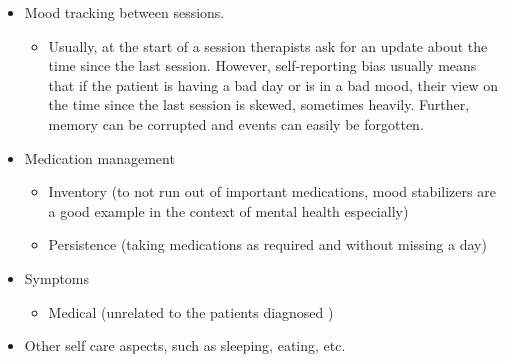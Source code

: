 \documentclass[11pt]{article}
\begin{document}
    \begin{itemize}
        \item Mood tracking between sessions.
        \begin{itemize}
            \item Usually, at the start of a session therapists ask for an update about the time since the last session.
            However, self-reporting bias usually means that if the patient is having a bad day or is in a bad mood, their view on the time since the last session is skewed, sometimes heavily.
            Further, memory can be corrupted and events can easily be forgotten.
        \end{itemize}
        \item Medication management
        \begin{itemize}
            \item Inventory (to not run out of important medications, mood stabilizers are a good example in the context of mental health especially)
            \item Persistence (taking medications as required and without missing a day)
        \end{itemize}
        \item Symptoms
        \begin{itemize}
            \item Medical (unrelated to the patients diagnosed )
        \end{itemize}
        \item Other self care aspects, such as sleeping, eating, etc.
    \end{itemize}
%
\end{document}
